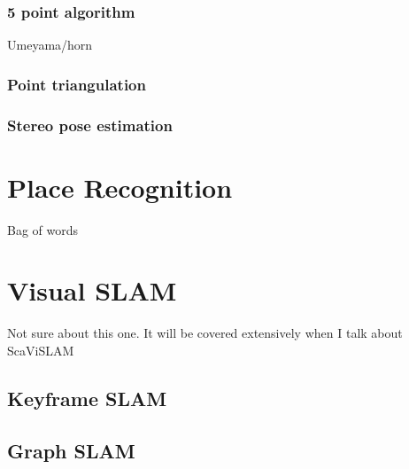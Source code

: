 \subsubsection{5 point algorithm}
Umeyama/horn

\subsubsection{Point triangulation}

\subsubsection{Stereo pose estimation}

\section{Place Recognition}

Bag of words

\section{Visual SLAM}
Not sure about this one.  It will be covered extensively when I talk about ScaViSLAM

\subsection{Keyframe SLAM}

\subsection{Graph SLAM}
